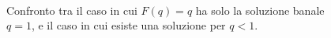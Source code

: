 \begin{figure}[t!]
	\centering
	$\;$
	\caption[Esistenza soluzione non banale.]{Confronto tra il caso in cui $F(q)=q$ ha solo la soluzione banale $q=1$, e il caso in cui esiste una soluzione per $q<1$.}
	\label{fig:banalita}
\end{figure}
\clearpage
